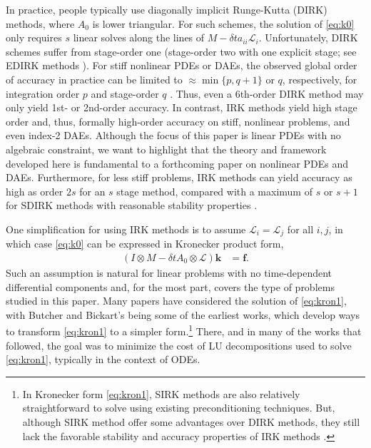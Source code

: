 \documentclass[review]{siamart}
\begin{document}
In practice, people typically use
diagonally implicit Runge-Kutta (DIRK) methods, where $A_0$ is lower triangular.
For such schemes, the solution of \eqref{eq:k0} only requires $s$ linear
solves along the lines of $ M - \delta ta_{ii}\mathcal{L}_i$. Unfortunately, DIRK
schemes suffer from stage-order one (stage-order two with one explicit stage; see
EDIRK methods \cite{butcher00}). For stiff nonlinear PDEs or DAEs, the observed
global order of accuracy
in practice can be limited to $\approx \min\{ p, q+1\}$ or $q$, respectively, for
integration order $p$ and stage-order $q$ \cite{hairer96,kennedy16}. Thus, even a
6th-order DIRK method may only yield 1st- or 2nd-order accuracy. In contrast, IRK
methods yield high stage order and, thus, formally high-order accuracy on stiff,
nonlinear problems, and even index-2 DAEs. Although the focus of this paper is
linear PDEs with no algebraic constraint, we want to highlight that the theory
and framework developed here is fundamental to a forthcoming paper on
nonlinear PDEs and DAEs. Furthermore, for less stiff
problems, IRK methods can yield accuracy as high as order $2s$ for an $s$ stage method,
compared with a maximum of $s$ or $s+1$ for SDIRK methods with reasonable stability
properties \cite[Section IV.6]{hairer96}.

One simplification for using IRK methods is to assume $\mathcal{L}_i =
\mathcal{L}_j$ for all $i,j$, in which case \eqref{eq:k0} can be expressed in
Kronecker product form,
%
\begin{align}\label{eq:kron1}
(I\otimes M - \delta t A_0\otimes \mathcal{L})\mathbf{k} & = \mathbf{f}.
\end{align}
%
Such an assumption is natural for linear problems with no time-dependent differential
components and, for the most part, covers the type of problems studied in this paper.
Many papers have considered the solution of \eqref{eq:kron1}, with Butcher
\cite{butcher76} and Bickart's \cite{bickart77} being some of the earliest works,
which develop ways to transform \eqref{eq:kron1} to a simpler form.\footnote{
In Kronecker form \eqref{eq:kron1}, SIRK methods \cite{norsett1976runge} are also
relatively straightforward to solve using existing preconditioning techniques.
But, although SIRK method offer some advantages over DIRK methods, they still lack
the favorable stability and accuracy properties of IRK methods \cite{burrage82,orel91}.}
There, and in many of the works that followed, the goal was to minimize the cost of LU
decompositions used to solve \eqref{eq:kron1}, typically in the context of ODEs.
\end{document}
